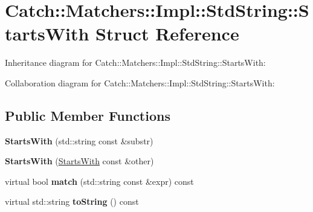 \hypertarget{structCatch_1_1Matchers_1_1Impl_1_1StdString_1_1StartsWith}{}\section{Catch\+:\+:Matchers\+:\+:Impl\+:\+:Std\+String\+:\+:Starts\+With Struct Reference}
\label{structCatch_1_1Matchers_1_1Impl_1_1StdString_1_1StartsWith}


Inheritance diagram for Catch\+:\+:Matchers\+:\+:Impl\+:\+:Std\+String\+:\+:Starts\+With\+:


Collaboration diagram for Catch\+:\+:Matchers\+:\+:Impl\+:\+:Std\+String\+:\+:Starts\+With\+:
\subsection*{Public Member Functions}
\begin{DoxyCompactItemize}
\item 
{\bfseries Starts\+With} (std\+::string const \&substr)\hypertarget{structCatch_1_1Matchers_1_1Impl_1_1StdString_1_1StartsWith_a1940dacb184d129adb33acea73dedc17}{}\label{structCatch_1_1Matchers_1_1Impl_1_1StdString_1_1StartsWith_a1940dacb184d129adb33acea73dedc17}

\item 
{\bfseries Starts\+With} (\hyperlink{structCatch_1_1Matchers_1_1Impl_1_1StdString_1_1StartsWith}{Starts\+With} const \&other)\hypertarget{structCatch_1_1Matchers_1_1Impl_1_1StdString_1_1StartsWith_a5526cb587632e7e46253d6f60ae01098}{}\label{structCatch_1_1Matchers_1_1Impl_1_1StdString_1_1StartsWith_a5526cb587632e7e46253d6f60ae01098}

\item 
virtual bool {\bfseries match} (std\+::string const \&expr) const \hypertarget{structCatch_1_1Matchers_1_1Impl_1_1StdString_1_1StartsWith_ae9c893adbacc853171a488aea5355653}{}\label{structCatch_1_1Matchers_1_1Impl_1_1StdString_1_1StartsWith_ae9c893adbacc853171a488aea5355653}

\item 
virtual std\+::string {\bfseries to\+String} () const \hypertarget{structCatch_1_1Matchers_1_1Impl_1_1StdString_1_1StartsWith_a066fe10e74495cb556abc6895193ba97}{}\label{structCatch_1_1Matchers_1_1Impl_1_1StdString_1_1StartsWith_a066fe10e74495cb556abc6895193ba97}

\end{DoxyCompactItemize}
